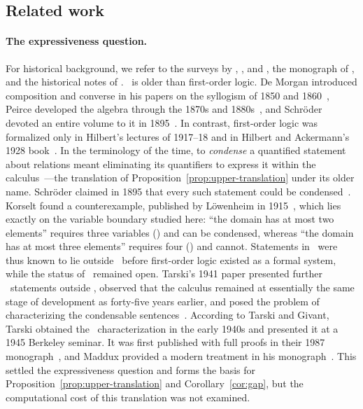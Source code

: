 \subsection{Related work}\label{sec:relwork}

\paragraph{The expressiveness question.}
For historical background, we refer to the surveys by \citet{pratt1992},
\citet{maddux1991}, and \citet{burris-legris}, the monograph of
\citet{brady2000}, and the historical notes of \citet{tarski-givant1987}.
\CoR\ is older than first-order logic. De Morgan introduced composition
and converse in his papers on the syllogism of 1850 and
1860~\citep{demorgan1856,demorgan1864}, Peirce developed the algebra
through the 1870s and 1880s~\citep{peirce1870,peirce1880}, and Schr\"oder
devoted an entire volume to it in 1895~\citep{schroeder1895}. In contrast,
first-order logic was formalized only in Hilbert's lectures of 1917--18 and
in Hilbert and Ackermann's 1928
book~\citep{hilbert-lectures,hilbert-ackermann1928,moore1988}. In the
terminology of the time, to \emph{condense} a quantified statement about
relations meant eliminating its quantifiers to express it within the
calculus~\citep[p.~233]{loewenheim1915}---the translation of
Proposition~\ref{prop:upper-translation} under its older name. Schr\"oder
claimed in 1895 that every such statement could be
condensed~\citep[p.~551]{schroeder1895}. Korselt found a counterexample,
published by L\"owenheim in 1915~\citep{loewenheim1915}, which lies
exactly on the variable boundary studied here: ``the domain has at most two
elements'' requires three variables (\FOthree) and can be condensed,
whereas ``the domain has at most three elements'' requires four (\FOfour) and
cannot. Statements in \FOfour\ were thus known to lie outside \CoR\
before first-order logic existed as a formal system, while the status of
\FOthree\ remained open.
Tarski's 1941 paper presented further
\FOfour\ statements outside \CoR,
observed that the calculus remained at essentially the same stage of development as forty-five years earlier,
and posed the problem of characterizing the
condensable sentences~\citep[pp.~74, 89]{tarski1941}.
According to Tarski and
Givant, Tarski obtained the \FOthree\ characterization in the early 1940s
and presented it at a 1945 Berkeley seminar. It was first published with full
proofs in their 1987 monograph~\citep[pp.~xvii, 88--89]{tarski-givant1987},
and Maddux provided a modern treatment in his monograph~\citep{maddux2006}.
This settled the expressiveness question and forms the basis for
Proposition~\ref{prop:upper-translation} and Corollary~\ref{cor:gap},
but the computational cost of this translation was not examined.

